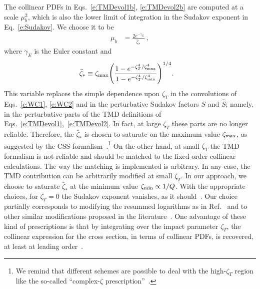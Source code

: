 \documentclass[aps,preprintnumbers,showpacs,nofootinbib,superscriptaddress,floatfix]{revtex4}
\newcommand{\bT}{\zeta_T}
\newcommand{\bb}{\zeta}
\begin{document}
The collinear PDFs in Eqs.~\eqref{e:TMDevol1b}, \eqref{e:TMDevol2b} are computed at a
scale $\mu_b^2$, which is also the lower limit of integration in the Sudakov
exponent in Eq.~\eqref{e:Sudakov}. We choose it to be
\begin{align} 
\mu_b &= \frac{2 e^{-\gamma_E}}{\bar{\bb}_{\ast}} \  ,
\label{e:mub}
\end{align}  
where $\gamma_E$ is the Euler constant and
\begin{align} 
\bar{\bb}_{\ast} &\equiv \bb_{\rm max} \Bigg(\frac{1-e^{- \bT^4 / \bb_{\rm max}^4} }{1-e^{- \bT^4 / \bb_{\rm min}^4}} \Bigg)^{1/4} .
\label{e:b*}
\end{align}  
This variable replaces the simple dependence upon $\bT$ in the
  convolutions of Eqs.~\eqref{e:WC1}, \eqref{e:WC2} and in the perturbative
  Sudakov factors $S$ and $\hat{S}$; namely, in the perturbative parts of the
  TMD definitions of Eqs.~\eqref{e:TMDevol1},~\eqref{e:TMDevol2}. In fact, at
  large $\bT$ these parts are no longer reliable. Therefore, the
  $\bar{\bb}_{\ast}$ is chosen to saturate on the maximum value $\bb_{\rm max}$,
  as suggested by the CSS 
  formalism~\cite{Collins:2011zzd,Aybat:2011zv}.\footnote{We remind that
  different schemes are possible to deal with 
the high-$\bT$ region like the so-called ``complex-$\bb$
prescription''~\cite{Laenen:2000de}.}
On the other hand, at
small $\bT$ the TMD formalism is not reliable and should be 
matched to the fixed-order collinear
calculations. The way
the matching is implemented is arbitrary.  In any case, the TMD contribution
can be arbitrarily modified at small $\bT$. In our approach, we choose to
saturate 
$\bar{\bb}_{\ast}$  at
the minimum value $\bb_{\rm min}\propto 1/Q$. With the appropriate choices, 
for $\bT=0$ the Sudakov exponent vanishes, as it
should~\cite{Parisi:1979se,Altarelli:1984pt}. 
Our choice partially corresponds to modifying the resummed logarithms as in
Ref.~\cite{Bozzi:2010xn} and to other similar modifications proposed in the
literature~\cite{Boer:2014tka,Collins:2016hqq}. One advantage of these kind of
prescriptions is that by integrating over the impact parameter $\bT$, the
collinear expression for the cross section, in terms of collinear PDFs, is
recovered, at least at leading order~\cite{Collins:2016hqq}.
\end{document}
